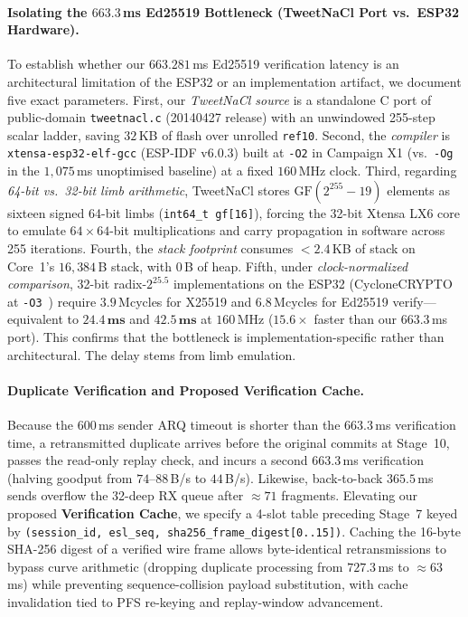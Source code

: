 \documentclass[conference]{IEEEtran}
\begin{document}
\paragraph{Isolating the $663.3$\,ms Ed25519 Bottleneck (TweetNaCl Port vs.\ ESP32 Hardware).}\label{sec:vc} To establish whether our $663.281$\,ms Ed25519 verification latency is an architectural limitation of the ESP32 or an implementation artifact, we document five exact parameters. First, our \textit{TweetNaCl source} is a standalone C port of public-domain \texttt{tweetnacl.c} (20140427 release) with an unwindowed 255-step scalar ladder, saving $32$\,KB of flash over unrolled \texttt{ref10}. Second, the \textit{compiler} is \texttt{xtensa-esp32-elf-gcc} (ESP-IDF v6.0.3) built at \texttt{-O2} in Campaign X1 (vs.\ \texttt{-Og} in the $1{,}075$\,ms unoptimised baseline) at a fixed $160$\,MHz clock. Third, regarding \textit{64-bit vs.\ 32-bit limb arithmetic}, TweetNaCl stores $\text{GF}(2^{255}-19)$ elements as sixteen signed 64-bit limbs (\texttt{int64\_t gf[16]}), forcing the 32-bit Xtensa LX6 core to emulate $64\times 64$-bit multiplications and carry propagation in software across 255 iterations. Fourth, the \textit{stack footprint} consumes $<2.4$\,KB of stack on Core~1's $16{,}384$\,B stack, with $0$\,B of heap. Fifth, under \textit{clock-normalized comparison}, 32-bit radix-$2^{25.5}$ implementations on the ESP32 (CycloneCRYPTO at \texttt{-O3}~\cite{oryx_esp32}) require $3.9$\,Mcycles for X25519 and $6.8$\,Mcycles for Ed25519 verify---equivalent to $\mathbf{24.4\,\textbf{ms}}$ and $\mathbf{42.5\,\textbf{ms}}$ at $160$\,MHz ($15.6\times$ faster than our $663.3$\,ms port). This confirms that the bottleneck is implementation-specific rather than architectural. The delay stems from limb emulation.

\paragraph{Duplicate Verification and Proposed Verification Cache.} Because the $600$\,ms sender ARQ timeout is shorter than the $663.3$\,ms verification time, a retransmitted duplicate arrives before the original commits at Stage~10, passes the read-only replay check, and incurs a second $663.3$\,ms verification (halving goodput from $74$--$88$\,B/s to $44$\,B/s). Likewise, back-to-back $365.5$\,ms sends overflow the 32-deep RX queue after $\approx 71$ fragments. Elevating our proposed \textbf{Verification Cache}, we specify a 4-slot table preceding Stage~7 keyed by \texttt{(session\_id, esl\_seq, sha256\_frame\_digest[0..15])}. Caching the 16-byte SHA-256 digest of a verified wire frame allows byte-identical retransmissions to bypass curve arithmetic (dropping duplicate processing from $727.3$\,ms to $\approx 63$\,ms) while preventing sequence-collision payload substitution, with cache invalidation tied to PFS re-keying and replay-window advancement.
\end{document}

